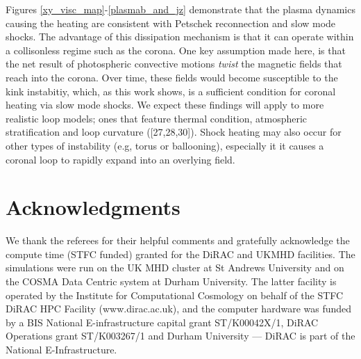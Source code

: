 \documentclass{./packages/rs/rsproca}
\begin{document}
Figures \ref{xy_visc_map}-\ref{plasmab_and_jz} demonstrate that the plasma dynamics causing the heating are consistent with Petschek reconnection and slow mode shocks. The advantage of this dissipation mechanism is that it can operate within a collisonless regime such as the corona. One key assumption made here, is that the net result of photospheric convective motions \textit{twist} the magnetic fields that reach into the corona. Over time, these fields would become susceptible to the kink instabitiy, which, as this work shows, is a sufficient condition for coronal heating via slow mode shocks. We expect these findings will apply to more realistic loop models; ones that feature thermal condition, atmospheric stratification and loop curvature ([27,28,30]). Shock heating may also occur for other types of instability (e.g, torus or ballooning), especially it it causes a coronal loop to rapidly expand into an overlying field. 


\section*{Acknowledgments}

We thank the referees for their helpful comments and gratefully acknowledge the compute time (STFC funded) granted for the DiRAC and UKMHD facilities. The simulations were run on the UK MHD cluster at St Andrews University and on the COSMA Data Centric system at Durham University. The latter facility is operated by the Institute for Computational Cosmology on behalf of the STFC DiRAC HPC Facility (www.dirac.ac.uk), and the computer hardware was funded by a BIS National E-infrastructure capital grant ST/K00042X/1, DiRAC Operations grant ST/K003267/1 and Durham University --- DiRAC is part of the National E-Infrastructure.
\end{document}
